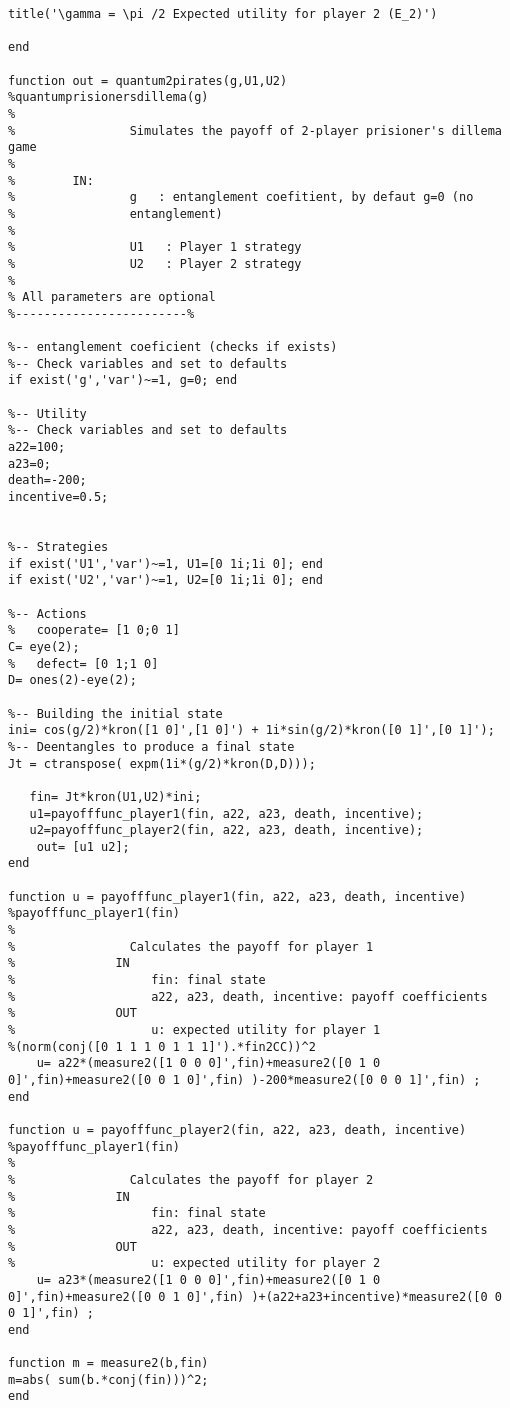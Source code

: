 \begin{lstlisting}
title('\gamma = \pi /2 Expected utility for player 2 (E_2)')

end

function out = quantum2pirates(g,U1,U2)
%quantumprisionersdillema(g)
%   
%                Simulates the payoff of 2-player prisioner's dillema game
%                 
%        IN:
%                g   : entanglement coefitient, by defaut g=0 (no
%                entanglement)
%               
%                U1   : Player 1 strategy
%                U2   : Player 2 strategy
%
% All parameters are optional
%------------------------%

%-- entanglement coeficient (checks if exists)
%-- Check variables and set to defaults
if exist('g','var')~=1, g=0; end

%-- Utility
%-- Check variables and set to defaults
a22=100;
a23=0;
death=-200;
incentive=0.5;


%-- Strategies
if exist('U1','var')~=1, U1=[0 1i;1i 0]; end
if exist('U2','var')~=1, U2=[0 1i;1i 0]; end

%-- Actions
%   cooperate= [1 0;0 1]
C= eye(2);
%   defect= [0 1;1 0]
D= ones(2)-eye(2);

%-- Building the initial state
ini= cos(g/2)*kron([1 0]',[1 0]') + 1i*sin(g/2)*kron([0 1]',[0 1]');
%-- Deentangles to produce a final state
Jt = ctranspose( expm(1i*(g/2)*kron(D,D)));

   fin= Jt*kron(U1,U2)*ini;
   u1=payofffunc_player1(fin, a22, a23, death, incentive);
   u2=payofffunc_player2(fin, a22, a23, death, incentive);
    out= [u1 u2];
end

function u = payofffunc_player1(fin, a22, a23, death, incentive)
%payofffunc_player1(fin)
%   
%                Calculates the payoff for player 1
%              IN
%                   fin: final state
%                   a22, a23, death, incentive: payoff coefficients
%              OUT
%                   u: expected utility for player 1
%(norm(conj([0 1 1 1 0 1 1 1]').*fin2CC))^2
    u= a22*(measure2([1 0 0 0]',fin)+measure2([0 1 0 0]',fin)+measure2([0 0 1 0]',fin) )-200*measure2([0 0 0 1]',fin) ;
end

function u = payofffunc_player2(fin, a22, a23, death, incentive)
%payofffunc_player1(fin)
%   
%                Calculates the payoff for player 2
%              IN
%                   fin: final state
%                   a22, a23, death, incentive: payoff coefficients
%              OUT
%                   u: expected utility for player 2
    u= a23*(measure2([1 0 0 0]',fin)+measure2([0 1 0 0]',fin)+measure2([0 0 1 0]',fin) )+(a22+a23+incentive)*measure2([0 0 0 1]',fin) ;
end

function m = measure2(b,fin)
m=abs( sum(b.*conj(fin)))^2;
end



\end{lstlisting}

